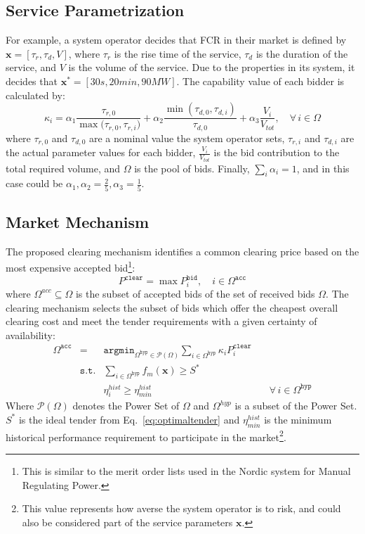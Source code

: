 \subsection*{Service Parametrization}
For example, a system operator decides that FCR in their market is defined by $\textbf{x} = [\tau_r,\tau_d,V]$, where $\tau_r$ is the rise time of the service, $\tau_d$ is the duration of the service, and $V$ is the volume of the service. Due to the properties in its system, it decides that $\textbf{x}^* = [30 s, 20 min, 90 MW]$. The capability value of each bidder is calculated by:
\begin{equation}
	\kappa_i = \alpha_1 \frac{\tau_{r,0}}{\max({\tau_{r,0},\tau_{r,i})}} + \alpha_2  \frac{\min(\tau_{d,0},\tau_{d,i})}{\tau_{d,0}} + \alpha_3 \frac{V_i}{V_{tot}}, \quad \forall \, i \in \Omega \label{eq:kappa_primfreq}
\end{equation}
where $\tau_{r,0}$ and $\tau_{d,0}$ are a nominal value the system operator sets, $\tau_{r,i}$ and $\tau_{d,i}$ are the actual parameter values for each bidder, $\frac{V_i}{V_{tot}}$ is the bid contribution to the total required volume, and $\Omega$ is the pool of bids. Finally, $\sum_{i} \alpha_i = 1$, and in this case could be $\alpha_1,\alpha_2 = \frac{2}{5}, \alpha_3 = \frac{1}{5}$.

\subsection*{Market Mechanism}
The proposed clearing mechanism identifies a common clearing price based on the most expensive accepted bid\footnote{This is similar to the merit order lists used in \eg the Nordic system for Manual Regulating Power\cite{bondy2013}.}:
\begin{equation}
    P^\mathtt{clear} = \max P^\mathtt{bid}_i, \quad i \in \Omega^\mathtt{acc}
\end{equation}
where $\Omega^{acc}\subseteq \Omega$ is the subset of accepted bids of the set of received bids $\Omega$. 
The clearing mechanism selects the subset of bids which offer the cheapest overall clearing cost and meet the tender requirements with a given certainty of availability: 
\begin{align}
      \Omega^\mathtt{acc} &= &\mathtt{argmin}_{\Omega^\mathtt{hyp} \in \mathcal P(\Omega)} \sum_{i\in \Omega^\mathtt{hyp}}{\kappa_i P^\mathtt{clear}_i } & \\
	  &\mathtt{s.t.}& \sum_{i\in \Omega^\mathtt{hyp}} f_m(\mathbf{x}) \geq S^* &  \\
      &~ & \eta^{hist}_i \geq \eta^{hist}_{min} &\quad \forall \, i \in \Omega^\mathtt{hyp} 
\end{align}
Where $\mathcal P(\Omega)$ denotes the Power Set of $\Omega$ and $\Omega^{hyp}$ is a subset of the Power Set. $S^*$ is the ideal tender from Eq.~\eqref{eq:optimaltender} and $\eta^{hist}_{min}$ is the minimum historical performance requirement to participate in the market\footnote{This value represents how averse the system operator is to risk, and could also be considered part of the service parameters $\textbf{x}$.}.

